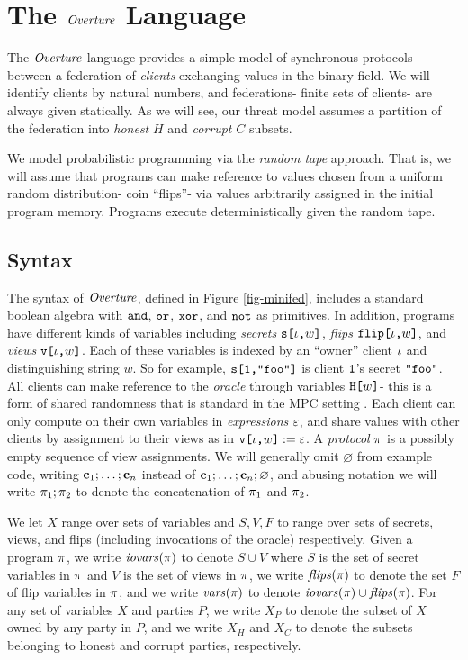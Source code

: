 \section{The $\mathit{Overture}$ Language}
\label{section-minicat}

The $\mathit{Overture}$ language provides a simple model of synchronous
protocols between a federation of \emph{clients} exchanging values in
the binary field. We will identify clients by natural numbers, and
federations- finite sets of clients- are always given statically.
As we will see, our threat model assumes a partition of the federation
into \emph{honest} $H$ and \emph{corrupt} $C$ subsets.

We model probabilistic programming via the \emph{random tape}
approach. That is, we will assume that programs can make reference to
values chosen from a uniform random distribution- coin ``flips''- via
values arbitrarily assigned in the initial program memory.  Programs
execute deterministically given the random tape. 

\subsection{Syntax} The syntax of $\mathit{Overture}$, defined in
Figure \ref{fig-minifed}, includes a standard boolean algebra
with $\texttt{and}$, $\texttt{or}$, $\texttt{xor}$, and $\texttt{not}$ as primitives. In addition,
programs have different kinds of variables including \emph{secrets}
$\texttt{s[}\iota\texttt{,}w\texttt{]}$, \emph{flips} $\texttt{flip[}\iota\texttt{,}w\texttt{]}$, and \emph{views}
$\texttt{v[}\iota\texttt{,}w\texttt{]}$.  Each of these variables is indexed by an ``owner''
client $\iota$ and distinguishing string $w$. So for example,
$\texttt{s[}\texttt{1}\texttt{,}\texttt{"foo"}\texttt{]}$ is client $\texttt{1}$'s secret 
$\texttt{"foo"}$. All clients can make reference to the \emph{oracle}
through variables $\texttt{H[}w\texttt{]}$- this is a form of shared randomness
that is standard in the MPC setting \cite{evans2018pragmatic}.  Each client can only
compute on their own variables in \emph{expressions} $\varepsilon$, and share
values with other clients by assignment to their views as in
$\texttt{v[}\iota\texttt{,}w\texttt{]} := \varepsilon$.  A \emph{protocol} $\pi$ is a
possibly empty sequence of view assignments. We will generally omit
$\varnothing$ from example code, writing $\mathbf{c}_1;\ldots;\mathbf{c}_n$
instead of $\mathbf{c}_1;\ldots;\mathbf{c}_n;\varnothing$, and abusing notation we will
write $\pi_1;\pi_2$ to denote the concatenation of $\pi_1$
and $\pi_2$.

We let $X$ range over sets of variables and $S,V,F$ to range over sets
of secrets, views, and flips (including invocations of the oracle)
respectively. Given a program $\pi$, we write $\mathit{iovars}(\pi)$ to
denote $S \cup V$ where $S$ is the set of secret variables in $\pi$
and $V$ is the set of views in $\pi$, we write $\mathit{flips}(\pi)$
to denote the set $F$ of flip variables in $\pi$, and we
write $\mathit{vars}(\pi)$ to denote $\mathit{iovars}(\pi) \cup \mathit{flips}(\pi)$. For any set of
variables $X$ and parties $P$, we write $X_P$ to denote the subset of
$X$ owned by any party in $P$, and we write $X_H$ and $X_C$ to denote
the subsets belonging to honest and corrupt parties, respectively.


